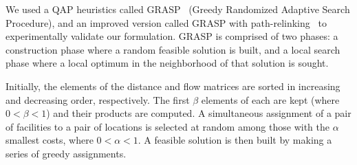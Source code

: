 \documentclass[english]{lni}
\begin{document}
We used a QAP heuristics called GRASP~\cite{LI94} (Greedy Randomized Adaptive
Search Procedure), and an improved version called GRASP with
path-relinking~\cite{OLIVEIRA04} to experimentally validate our formulation.
GRASP is comprised of two phases: a construction phase where a random feasible
solution is built, and a local search phase where a local optimum in the
neighborhood of that solution is sought.

Initially, the elements of the distance and flow matrices are sorted in
increasing and decreasing order, respectively. The first $\beta$ elements
of each are kept (where $0 < \beta < 1$) and their products are computed.
A simultaneous assignment of a pair of facilities to a pair of locations
is selected at random among those with the $\alpha$ smallest costs, where
$0 < \alpha < 1$. A feasible solution is then built by making a series of greedy
assignments.
\end{document}
